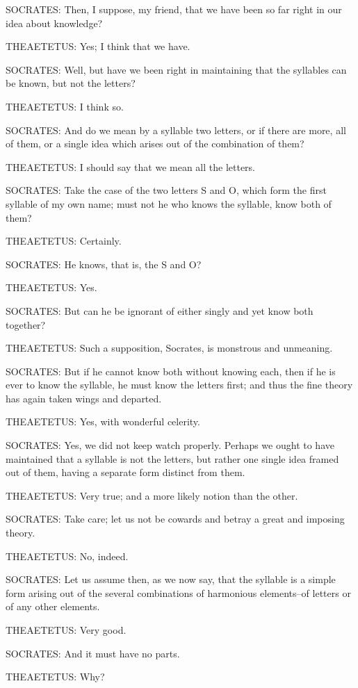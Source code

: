 SOCRATES: Then, I suppose, my friend, that we have been so far right in
our idea about knowledge?

THEAETETUS: Yes; I think that we have.

SOCRATES: Well, but have we been right in maintaining that the syllables
can be known, but not the letters?

THEAETETUS: I think so.

SOCRATES: And do we mean by a syllable two letters, or if there are
more, all of them, or a single idea which arises out of the combination
of them?

THEAETETUS: I should say that we mean all the letters.

SOCRATES: Take the case of the two letters S and O, which form the first
syllable of my own name; must not he who knows the syllable, know both
of them?

THEAETETUS: Certainly.

SOCRATES: He knows, that is, the S and O?

THEAETETUS: Yes.

SOCRATES: But can he be ignorant of either singly and yet know both
together?

THEAETETUS: Such a supposition, Socrates, is monstrous and unmeaning.

SOCRATES: But if he cannot know both without knowing each, then if he is
ever to know the syllable, he must know the letters first; and thus the
fine theory has again taken wings and departed.

THEAETETUS: Yes, with wonderful celerity.

SOCRATES: Yes, we did not keep watch properly. Perhaps we ought to have
maintained that a syllable is not the letters, but rather one single
idea framed out of them, having a separate form distinct from them.

THEAETETUS: Very true; and a more likely notion than the other.

SOCRATES: Take care; let us not be cowards and betray a great and
imposing theory.

THEAETETUS: No, indeed.

SOCRATES: Let us assume then, as we now say, that the syllable is
a simple form arising out of the several combinations of harmonious
elements--of letters or of any other elements.

THEAETETUS: Very good.

SOCRATES: And it must have no parts.

THEAETETUS: Why?

